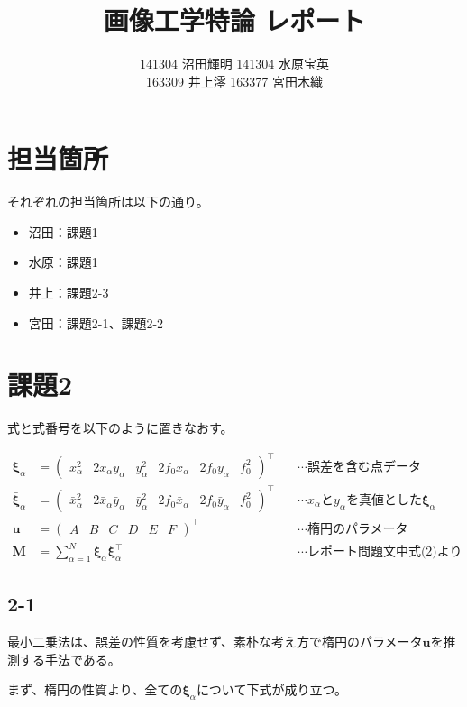 \documentclass[12pt,a4j]{jsarticle}
\title{画像工学特論 レポート}
\author{141304 沼田輝明  141304 水原宝英 \\ 163309 井上澪  163377 宮田木織}
\newcommand{\xa}{x_\alpha}
\newcommand{\bxa}{\bar{x}_\alpha}
\newcommand{\ya}{y_\alpha}
\newcommand{\bya}{\bar{y}_\alpha}
\newcommand{\xia}{\bm{\xi}_\alpha}
\newcommand{\bxia}{\bar{\bm{\xi}}_\alpha}
\begin{document}
  \maketitle %
  \newpage

\section*{担当箇所}
  それぞれの担当箇所は以下の通り。
  \begin{itemize}
    \item 沼田：課題1
    \item 水原：課題1
    \item 井上：課題2-3
    \item 宮田：課題2-1、課題2-2
  \end{itemize}
  \newpage

\section*{課題2}
  式と式番号を以下のように置きなおす。

  \begin{align}
    \xia &= \begin{pmatrix}\xa^2 & 2\xa\ya & \ya^2 & 2f_0\xa & 2f_0\ya & f_0^2\end{pmatrix}^\top
     & \quad\cdots\text{誤差を含む点データ} \\
    \bxia &= \begin{pmatrix}\bxa^2 & 2\bxa\bya & \bya^2 & 2f_0\bxa & 2f_0\bya & f_0^2\end{pmatrix}^\top
     & \quad\cdots\text{$\xa$と$\ya$を真値とした$\xia$} \\
    \bm{u} &= \begin{pmatrix}A & B & C & D & E & F\end{pmatrix}^\top
     & \quad\cdots\text{楕円のパラメータ} \\
    \bm{M} &= \sum_{\alpha = 1}^N \xia \xia^\top
     & \quad\cdots\text{レポート問題文中式(2)より} \label{eq:M}
  \end{align}

  \subsection*{2-1}
  最小二乗法は、誤差の性質を考慮せず、素朴な考え方で楕円のパラメータ$\bm{u}$を推測する手法である。\par
  まず、楕円の性質より、全ての$\bxia$について下式が成り立つ。
\end{document}
